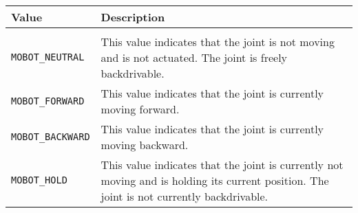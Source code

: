 \\
\noindent
\begin{tabular}{p{1.75in}p{4.5in}} \hline 
Value & Description \\
\hline \\
\texttt{MOBOT\_NEUTRAL}& This value indicates that the joint is not moving and is not actuated. The joint is freely backdrivable. \\
\texttt{MOBOT\_FORWARD}& This value indicates that the joint is currently moving forward. \\
\texttt{MOBOT\_BACKWARD}& This value indicates that the joint is currently moving backward. \\
\texttt{MOBOT\_HOLD}& This value indicates that the joint is currently not moving and is holding its current position. The joint is not currently backdrivable. \\
\hline
\end{tabular}\\

